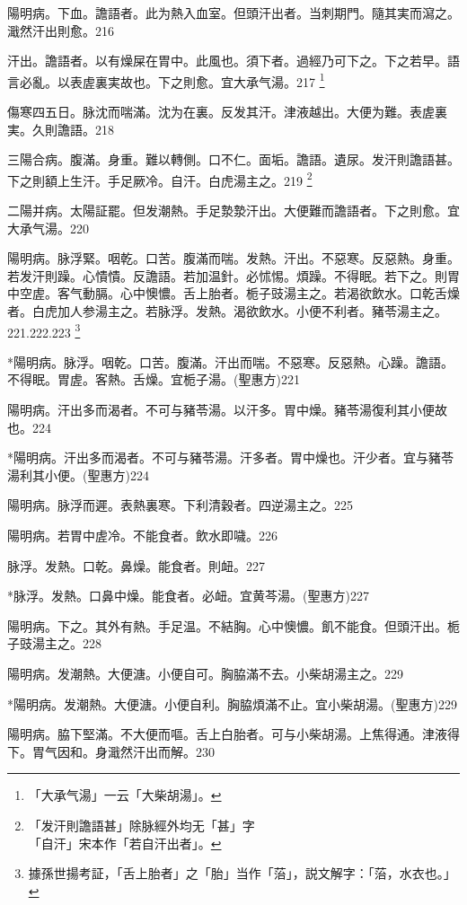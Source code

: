 陽明病。下血。譫語者。此为熱入血室。但頭汗出者。当刺期門。隨其実而瀉之。濈然汗出則愈。216

汗出。譫語者。以有燥屎在胃中。此風也。{\khaaitp 須下者。}過經乃可下之。下之若早。語言必亂。以表虗裏実故也。下之則愈。宜{\khaaitp 大}承气湯。217
	\footnote{「大承气湯」一云「大柴胡湯」。}

傷寒四五日。脉沈而喘滿。沈为在裏。反发其汗。津液越出。大便为難。表虗裏実。久則譫語。218

三陽合病。腹滿。身重。難以轉側。口不仁。面垢。譫語。遺尿。发汗則譫語{\khaaitp 甚}。下之則額上生汗。手足厥冷。自汗。白虎湯主之。219
	\footnote{「发汗則譫語甚」除脉經外均无「甚」字\\「自汗」宋本作「若自汗出者」。}

二陽并病。太陽証罷。但发潮熱。手足漐漐汗出。大便難而譫語者。下之則愈。宜{\khaaitp 大}承气湯。220

陽明病。脉浮緊。咽乾。口苦。腹滿而喘。发熱。汗出。不惡寒。反惡熱。身重。若发汗則躁。心憒憒。反譫語。若加温針。必怵惕。煩躁。不得眠。若下之。則胃中空虗。客气動膈。心中懊憹。舌上胎者。栀子{\khaaitp 豉}湯主之。若渴欲飲水。口乾舌燥者。白虎{\khaaitp 加人参}湯主之。若脉浮。发熱。渴欲飲水。小便不利者。豬苓湯主之。221.222.223
	\footnote{據孫世揚考証，「舌上胎者」之「胎」当作「菭」，説文解字：「菭，水衣也。」}

*陽明病。脉浮。咽乾。口苦。腹滿。汗出而喘。不惡寒。反惡熱。心躁。譫語。不得眠。胃虗。客熱。舌燥。宜栀子湯。(聖惠方)221

陽明病。汗出多而渴者。不可与豬苓湯。以汗多。胃中燥。豬苓湯復利其小便故也。224

*陽明病。汗出多而渴者。不可与豬苓湯。汗多者。胃中燥也。汗少者。宜与豬苓湯利其小便。(聖惠方)224

{\khaaitp 陽明病。}脉浮而遲。表熱裏寒。下利清穀者。四逆湯主之。225

{\khaaitp 陽明病。}若胃中虗冷。不能食者。飲水即噦。226

脉浮。发熱。口乾。鼻燥。能食者。則衄。227

*脉浮。发熱。口鼻中燥。能食者。必衄。宜黄芩湯。(聖惠方)227

陽明病。下之。其外有熱。手足温。不結胸。心中懊憹。飢不能食。但頭汗出。栀子{\khaaitp 豉}湯主之。228

陽明病。发潮熱。大便溏。小便自可。胸脇滿不去。小柴胡湯主之。229

*陽明病。发潮熱。大便溏。小便自利。胸脇煩滿不止。宜小柴胡湯。(聖惠方)229

陽明病。脇下堅滿。不大便而嘔。舌上白胎者。可与小柴胡湯。上焦得通。津液得下。胃气因和。身濈然汗出而解。230


